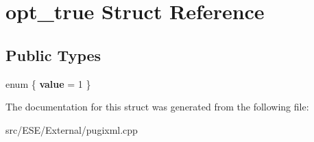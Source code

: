 \hypertarget{structopt__true}{\section{opt\-\_\-true Struct Reference}
\label{structopt__true}
}
\subsection*{Public Types}
\begin{DoxyCompactItemize}
\item 
enum \{ {\bfseries value} = 1
 \}
\end{DoxyCompactItemize}


The documentation for this struct was generated from the following file\-:\begin{DoxyCompactItemize}
\item 
src/\-E\-S\-E/\-External/pugixml.\-cpp\end{DoxyCompactItemize}

